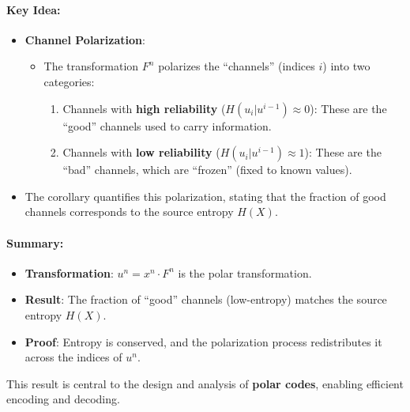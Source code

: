 \documentclass[11pt]{article}
\providecommand{\tightlist}{%
      \setlength{\itemsep}{0pt}\setlength{\parskip}{0pt}}
\begin{document}
\paragraph{Key Idea:}\label{key-idea}

\begin{itemize}
\tightlist
\item
  \textbf{Channel Polarization}:

  \begin{itemize}
  \tightlist
  \item
    The transformation \(F^n\) polarizes the ``channels'' (indices
    \(i\)) into two categories:

    \begin{enumerate}
    \def\labelenumi{\arabic{enumi}.}
    \tightlist
    \item
      Channels with \textbf{high reliability}
      (\(H(u_i | u^{i-1}) \approx 0\)): These are the ``good'' channels
      used to carry information.
    \item
      Channels with \textbf{low reliability}
      (\(H(u_i | u^{i-1}) \approx 1\)): These are the ``bad'' channels,
      which are ``frozen'' (fixed to known values).
    \end{enumerate}
  \end{itemize}
\item
  The corollary quantifies this polarization, stating that the fraction
  of good channels corresponds to the source entropy \(H(X)\).
\end{itemize}

\paragraph{Summary:}\label{summary}

\begin{itemize}
\tightlist
\item
  \textbf{Transformation}: \(u^n = x^n \cdot F^n\) is the polar
  transformation.
\item
  \textbf{Result}: The fraction of ``good'' channels (low-entropy)
  matches the source entropy \(H(X)\).
\item
  \textbf{Proof}: Entropy is conserved, and the polarization process
  redistributes it across the indices of \(u^n\).
\end{itemize}

This result is central to the design and analysis of \textbf{polar
codes}, enabling efficient encoding and decoding.
\end{document}
